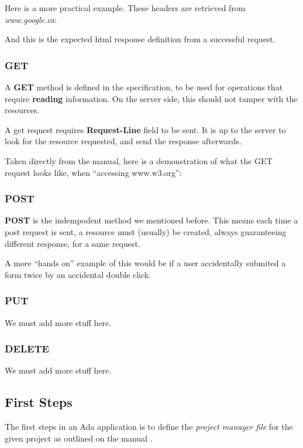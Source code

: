 Here is a more practical example. These headers are retrieved from \textit{www.google.ca}:


And this is the expected html response definition from a successful request.


\subsubsection{GET} 
A \textbf{GET} method is defined in the specification, to be used for operations that
require \textbf{reading} information. On the server side, this should not
tamper with the resources. 

A get request requires \textbf{Request-Line} field to be sent. It is up to the
server to look for the resource requested, and send the response afterwards.

Taken directly from the manual, here is a demonstration of what the GET request
looks like, when ``accessing www.w3.org'':


\subsubsection{POST}
\textbf{POST} is the indempodent method we mentioned before. This means each
time a post request is sent, a resource must (usually) be created, always
guaranteeing different response, for a same request.

A more ``hands on'' example of this would be if a user accidentally submited a
form twice by an accidental double click.

\subsubsection{PUT}
We must add more stuff here.

\subsubsection{DELETE} 
We must add more stuff here.

\subsection{First Steps}
The first steps in an Ada application is to define the \textit{project manager 
file} for the given project as outlined on the manual \cite{GNATintro}.

